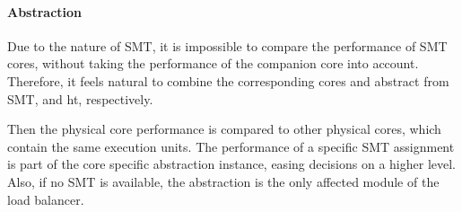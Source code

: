 \paragraph{Abstraction}
Due to the nature of SMT, it is impossible to compare the performance of SMT
cores, without taking the performance of the companion core into account.
Therefore, it feels natural to combine the corresponding cores and abstract
from SMT, and \gls{ht}, respectively.

Then the physical core performance is compared to other physical
cores, which contain the same execution units.
The performance of a specific SMT assignment is part of the core specific
abstraction instance, easing decisions on a higher level.
Also, if no SMT is available, the abstraction is the only affected module of
the load balancer.
